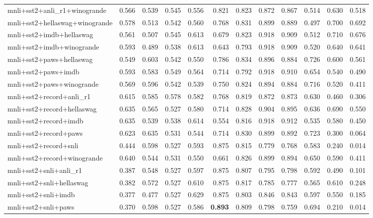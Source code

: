\begin{table}[t]
\begin{tabular}{lrrrrrrrrrrr}
    mnli+sst2+anli\_r1+winogrande & 0.566 & 0.539 & 0.545 & 0.556 & 0.821 & 0.823 & 0.872 & 0.867 & 0.514 & 0.630 & 0.518 \\
    mnli+sst2+hellaswag+winogrande & 0.578 & 0.513 & 0.542 & 0.560 & 0.768 & 0.831 & 0.899 & 0.889 & 0.497 & 0.700 & 0.692 \\
    mnli+sst2+imdb+hellaswag & 0.561 & 0.507 & 0.545 & 0.613 & 0.679 & 0.823 & 0.918 & 0.909 & 0.512 & 0.710 & 0.676 \\
    mnli+sst2+imdb+winogrande & 0.593 & 0.489 & 0.538 & 0.613 & 0.643 & 0.793 & 0.918 & 0.909 & 0.520 & 0.640 & 0.641 \\
    mnli+sst2+paws+hellaswag & 0.549 & 0.603 & 0.542 & 0.550 & 0.786 & 0.834 & 0.896 & 0.884 & 0.726 & 0.600 & 0.561 \\
    mnli+sst2+paws+imdb & 0.593 & 0.583 & 0.549 & 0.564 & 0.714 & 0.792 & 0.918 & 0.910 & 0.654 & 0.540 & 0.490 \\
    mnli+sst2+paws+winogrande & 0.569 & 0.596 & 0.542 & 0.539 & 0.750 & 0.824 & 0.894 & 0.884 & 0.716 & 0.520 & 0.411 \\
    mnli+sst2+record+anli\_r1 & 0.615 & 0.585 & 0.578 & 0.582 & 0.768 & 0.819 & 0.872 & 0.873 & 0.630 & 0.460 & 0.306 \\
    mnli+sst2+record+hellaswag & 0.635 & 0.565 & 0.527 & 0.580 & 0.714 & 0.828 & 0.904 & 0.895 & 0.636 & 0.690 & 0.550 \\
    mnli+sst2+record+imdb & 0.635 & 0.539 & 0.538 & 0.614 & 0.554 & 0.816 & 0.918 & 0.912 & 0.535 & 0.580 & 0.450 \\
    mnli+sst2+record+paws & 0.623 & 0.635 & 0.531 & 0.544 & 0.714 & 0.830 & 0.899 & 0.892 & 0.723 & 0.300 & 0.064 \\
    mnli+sst2+record+snli & 0.444 & 0.598 & 0.527 & 0.593 & 0.875 & 0.815 & 0.779 & 0.768 & 0.583 & 0.240 & 0.014 \\
    mnli+sst2+record+winogrande & 0.640 & 0.544 & 0.531 & 0.550 & 0.661 & 0.826 & 0.899 & 0.894 & 0.650 & 0.590 & 0.411 \\
    mnli+sst2+snli+anli\_r1 & 0.387 & 0.548 & 0.527 & 0.597 & 0.875 & 0.807 & 0.795 & 0.798 & 0.592 & 0.490 & 0.101 \\
    mnli+sst2+snli+hellaswag & 0.382 & 0.572 & 0.527 & 0.610 & 0.875 & 0.817 & 0.785 & 0.777 & 0.565 & 0.610 & 0.248 \\
    mnli+sst2+snli+imdb & 0.377 & 0.477 & 0.527 & 0.629 & 0.875 & 0.803 & 0.846 & 0.843 & 0.597 & 0.550 & 0.185 \\
    mnli+sst2+snli+paws & 0.370 & 0.598 & 0.527 & 0.586 & \textbf{0.893} & 0.809 & 0.798 & 0.759 & 0.694 & 0.210 & 0.014 \\

\end{tabular}
\end{table}

